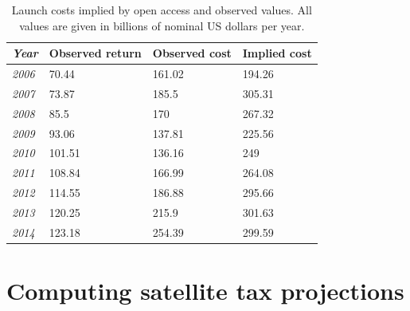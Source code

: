 \documentclass[12pt]{article}
\begin{document}
\begin{table}[]
	\centering
	\begin{tabular}{|l|l|l|l|}
		\hline
		\textit{Year} & \multicolumn{1}{l|}{Observed return} & \multicolumn{1}{l|}{Observed cost} & \multicolumn{1}{l|}{Implied cost} \\ \hline
		\textit{2006} & 70.44                                & 161.02                             & 194.26                            \\ \hline
		\textit{2007} & 73.87                                & 185.5                              & 305.31                            \\ \hline
		\textit{2008} & 85.5                                 & 170                                & 267.32                            \\ \hline
		\textit{2009} & 93.06                                & 137.81                             & 225.56                            \\ \hline
		\textit{2010} & 101.51                               & 136.16                             & 249                               \\ \hline
		\textit{2011} & 108.84                               & 166.99                             & 264.08                            \\ \hline
		\textit{2012} & 114.55                               & 186.88                             & 295.66                            \\ \hline
		\textit{2013} & 120.25                               & 215.9                              & 301.63                            \\ \hline
		\textit{2014} & 123.18                               & 254.39                             & 299.59                            \\ \hline
	\end{tabular}
	\caption{Launch costs implied by open access and observed values. All values are given in billions of nominal US dollars per year.}
	\label{launchCosts}
\end{table}

\section{Computing satellite tax projections}
\end{document}
